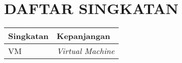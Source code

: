 {}
\chapter*{DAFTAR SINGKATAN}

\begin{center}
  \begin{tabular}{|l|l|}
    \hline
    \rowcolor[HTML]{C0C0C0}
    \textbf{Singkatan} & \textbf{Kepanjangan} \\
    \hline
    VM & \emph{Virtual Machine} \\
    \hline
  \end{tabular}
\end{center}

\cleardoublepage

